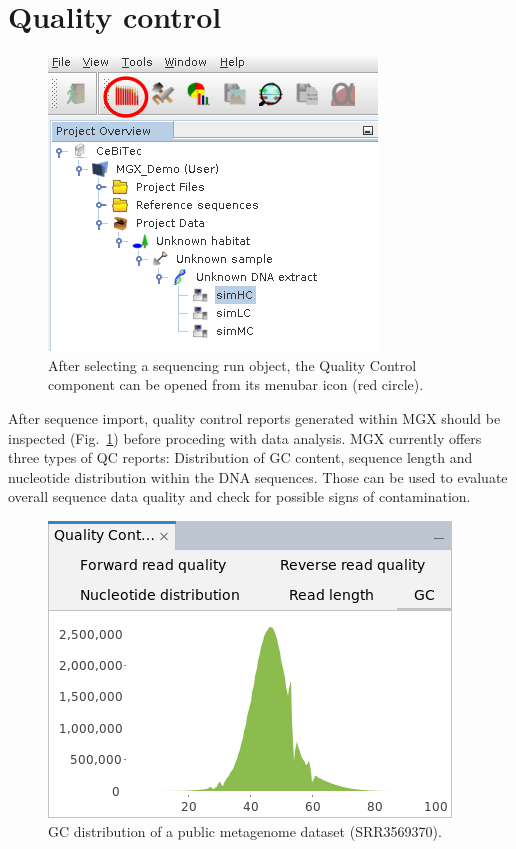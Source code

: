 \section{Quality control}

\begin{figure}[H]
\centering
\includegraphics[width=.6\textwidth]{img/mgx/QCopen}
\caption[Quality control]{After selecting a sequencing run object, the Quality Control component can be opened
from its menubar icon (red circle).}
\label{qcopen}
\end{figure}

After sequence import, quality control reports generated within MGX should be inspected (Fig.~\ref{qcopen}) before proceding with data analysis.
MGX currently offers three types of QC reports: Distribution of GC content, sequence length
and nucleotide distribution within the DNA sequences. Those can be used to evaluate overall
sequence data quality and check for possible signs of contamination.

\begin{figure}[H]
\centering
\includegraphics[width=.6\textwidth]{img/mgx/QCgc}
\caption[Quality control]{GC distribution of a public metagenome dataset (SRR3569370).}
\label{qc1}
\end{figure}

